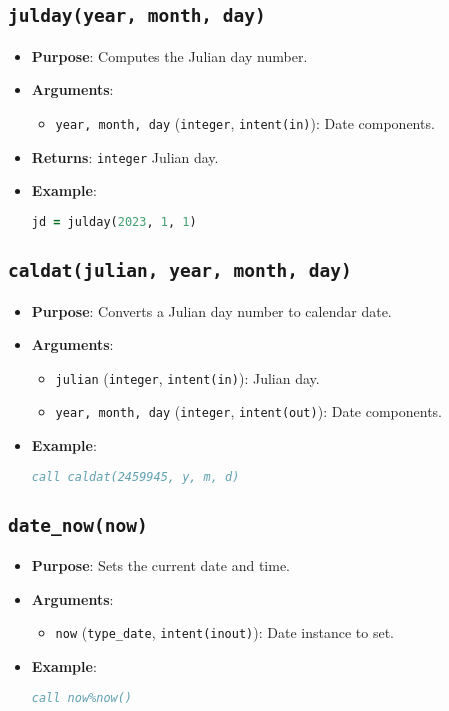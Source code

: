\documentclass[12pt,a4paper]{report}
\begin{document}
\subsection{\texttt{julday(year, month, day)}}
\begin{itemize}
\item \textbf{Purpose}: Computes the Julian day number.
\item \textbf{Arguments}:
\begin{itemize}
\item \texttt{year, month, day} (\texttt{integer}, \texttt{intent(in)}): Date components.
\end{itemize}
\item \textbf{Returns}: \texttt{integer} Julian day.
\item \textbf{Example}:
\begin{lstlisting}[language=Fortran]
jd = julday(2023, 1, 1)
\end{lstlisting}
\end{itemize}

\subsection{\texttt{caldat(julian, year, month, day)}}
\begin{itemize}
\item \textbf{Purpose}: Converts a Julian day number to calendar date.
\item \textbf{Arguments}:
\begin{itemize}
\item \texttt{julian} (\texttt{integer}, \texttt{intent(in)}): Julian day.
\item \texttt{year, month, day} (\texttt{integer}, \texttt{intent(out)}): Date components.
\end{itemize}
\item \textbf{Example}:
\begin{lstlisting}[language=Fortran]
call caldat(2459945, y, m, d)
\end{lstlisting}
\end{itemize}

\subsection{\texttt{date\_now(now)}}
\begin{itemize}
\item \textbf{Purpose}: Sets the current date and time.
\item \textbf{Arguments}:
\begin{itemize}
\item \texttt{now} (\texttt{type\_date}, \texttt{intent(inout)}): Date instance to set.
\end{itemize}
\item \textbf{Example}:
\begin{lstlisting}[language=Fortran]
call now%now()
\end{lstlisting}
\end{itemize}
\end{document}
